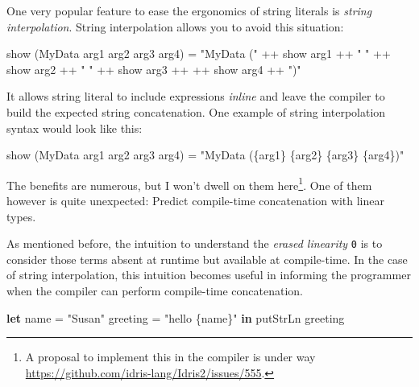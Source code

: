 \documentclass[
]{article}
\newenvironment{Shaded}{}{}
\newcommand{\DataTypeTok}[1]{\textcolor[rgb]{0.56,0.13,0.00}{#1}}
\newcommand{\FunctionTok}[1]{\textcolor[rgb]{0.02,0.16,0.49}{#1}}
\newcommand{\KeywordTok}[1]{\textcolor[rgb]{0.00,0.44,0.13}{\textbf{#1}}}
\newcommand{\NormalTok}[1]{#1}
\newcommand{\OperatorTok}[1]{\textcolor[rgb]{0.40,0.40,0.40}{#1}}
\newcommand{\OtherTok}[1]{\textcolor[rgb]{0.00,0.44,0.13}{#1}}
\newcommand{\StringTok}[1]{\textcolor[rgb]{0.25,0.44,0.63}{#1}}
\begin{document}
One very popular feature to ease the ergonomics of string literals is
\emph{string interpolation}. String interpolation allows you to avoid
this situation:

\begin{Shaded}
\begin{Highlighting}[]
\FunctionTok{show}\NormalTok{ (}\DataTypeTok{MyData}\NormalTok{ arg1 arg2 arg3 arg4) }\OtherTok{=} 
    \StringTok{"MyData ("} \OperatorTok{++} \FunctionTok{show}\NormalTok{ arg1 }\OperatorTok{++} \StringTok{" "} \OperatorTok{++} \FunctionTok{show}\NormalTok{ arg2 }\OperatorTok{++} \StringTok{" "} \OperatorTok{++} \FunctionTok{show}\NormalTok{ arg3 }\OperatorTok{++} \OperatorTok{++} \FunctionTok{show}\NormalTok{ arg4 }\OperatorTok{++} \StringTok{")"}
\end{Highlighting}
\end{Shaded}

It allows string literal to include expressions \emph{inline} and leave
the compiler to build the expected string concatenation. One example of
string interpolation syntax would look like this:

\begin{Shaded}
\begin{Highlighting}[]
\FunctionTok{show}\NormalTok{ (}\DataTypeTok{MyData}\NormalTok{ arg1 arg2 arg3 arg4) }\OtherTok{=} \StringTok{"MyData (\{arg1\} \{arg2\} \{arg3\} \{arg4\})"}
\end{Highlighting}
\end{Shaded}

The benefits are numerous, but I won't dwell on them here\footnote{A
  proposal to implement this in the compiler is under way
  \url{https://github.com/idris-lang/Idris2/issues/555}.}. One of them
however is quite unexpected: Predict compile-time concatenation with
linear types.

As mentioned before, the intuition to understand the \emph{erased
linearity} \texttt{0} is to consider those terms absent at runtime but
available at compile-time. In the case of string interpolation, this
intuition becomes useful in informing the programmer when the compiler
can perform compile-time concatenation.

\begin{Shaded}
\begin{Highlighting}[]
\KeywordTok{let}\NormalTok{ name }\OtherTok{=} \StringTok{"Susan"}
\NormalTok{    greeting }\OtherTok{=} \StringTok{"hello \{name\}"} \KeywordTok{in}
    \FunctionTok{putStrLn}\NormalTok{ greeting}
\end{Highlighting}
\end{Shaded}
\end{document}

